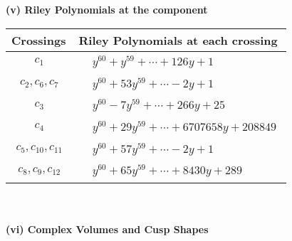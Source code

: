 \documentclass[1p]{elsarticle_modified}
\theoremstyle{definition}
\begin{document}
\newpage\renewcommand{\arraystretch}{1}
\flushleft \textbf{(v) Riley Polynomials at the component}\newline \\
\begin{tabular}{m{50pt}|m{274pt}}
Crossings & \hspace{64pt}Riley Polynomials at each crossing \\
\hline $$\begin{aligned}c_{1}\end{aligned}$$&$\begin{aligned}
&y^{60}+y^{59}+\cdots+126 y+1
\end{aligned}$\\
\hline $$\begin{aligned}c_{2},c_{6},c_{7}\end{aligned}$$&$\begin{aligned}
&y^{60}+53 y^{59}+\cdots-2 y+1
\end{aligned}$\\
\hline $$\begin{aligned}c_{3}\end{aligned}$$&$\begin{aligned}
&y^{60}-7 y^{59}+\cdots+266 y+25
\end{aligned}$\\
\hline $$\begin{aligned}c_{4}\end{aligned}$$&$\begin{aligned}
&y^{60}+29 y^{59}+\cdots+6707658 y+208849
\end{aligned}$\\
\hline $$\begin{aligned}c_{5},c_{10},c_{11}\end{aligned}$$&$\begin{aligned}
&y^{60}+57 y^{59}+\cdots-2 y+1
\end{aligned}$\\
\hline $$\begin{aligned}c_{8},c_{9},c_{12}\end{aligned}$$&$\begin{aligned}
&y^{60}+65 y^{59}+\cdots+8430 y+289
\end{aligned}$\\
\hline
\end{tabular}\\~\\
\newpage\flushleft \textbf{(vi) Complex Volumes and Cusp Shapes}
\end{document}
